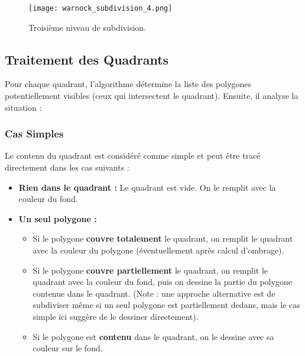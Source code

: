 \documentclass{article}
\begin{document}
\begin{figure}[H]
\centering
\texttt{[image: warnock\_subdivision\_4.png]}
\caption{Troisième niveau de subdivision.}
\label{fig:warnock_subdiv_4}
\end{figure}

\subsection{Traitement des Quadrants}

Pour chaque quadrant, l'algorithme détermine la liste des polygones potentiellement visibles (ceux qui intersectent le quadrant). Ensuite, il analyse la situation :

\subsubsection{Cas Simples}
Le contenu du quadrant est considéré comme simple et peut être tracé directement dans les cas suivants :
\begin{itemize}
    \item \textbf{Rien dans le quadrant :} Le quadrant est vide. On le remplit avec la couleur du fond.
    \item \textbf{Un seul polygone :}
        \begin{itemize}
            \item Si le polygone \textbf{couvre totalement} le quadrant, on remplit le quadrant avec la couleur du polygone (éventuellement après calcul d'ombrage).
            \item Si le polygone \textbf{couvre partiellement} le quadrant, on remplit le quadrant avec la couleur du fond, puis on dessine la partie du polygone contenue dans le quadrant. (Note : une approche alternative est de subdiviser même si un seul polygone est partiellement dedans, mais le cas simple ici suggère de le dessiner directement).
            \item Si le polygone est \textbf{contenu} dans le quadrant, on le dessine avec sa couleur sur le fond.
        \end{itemize}
\end{itemize}
\end{document}
